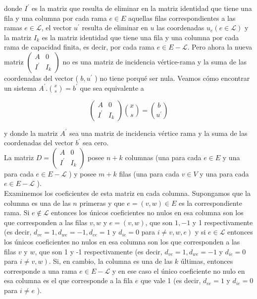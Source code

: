\documentclass[10pt]{article}
\begin{document}
donde $I^{\prime}$ es la matriz que resulta de eliminar en la matriz identidad que tiene una fila y una columna por cada rama $e \in E$ aquellas filas correspondientes a las ramas $e \in \mathcal{L}$, el vector $u^{\prime}$ resulta de eliminar en $u$ las coordenadas $u_{e}(e \in \mathcal{L})$ y la matriz $I_{k}$ es la matriz identidad que tiene una fila y una columna por cada rama de capacidad finita, es decir, por cada rama $e \in E-\mathcal{L}$. Pero ahora la nueva matriz $\left(\begin{array}{cc}A & 0 \\ I^{\prime} & I_{k}\end{array}\right)$ no es una matriz de incidencia vértice-rama y la suma de las coordenadas del vector ( $b, u^{\prime}$ ) no tiene porqué ser nula. Veamos cómo encontrar un sistema $A^{\prime} .\binom{x}{s}=b^{\prime}$ que sea equivalente a

$$
\left(\begin{array}{cc}
A & 0 \\
I^{\prime} & I_{k}
\end{array}\right)\binom{x}{s}=\binom{b}{u^{\prime}}
$$

y donde la matriz $A^{\prime}$ sea una matriz de incidencia vértice rama y la suma de las coordenadas del vector $b^{\prime}$ sea cero.\\
La matriz $D=\left(\begin{array}{cc}A & 0 \\ I^{\prime} & I_{k}\end{array}\right)$ posee $n+k$ columnas (una para cada $e \in E$ y una para cada $e \in E-\mathcal{L}$ ) y posee $m+k$ filas (una para cada $v \in V$ y una para cada $e \in E-\mathcal{L}$ ).\\
Examinemos los coeficientes de esta matriz en cada columna. Supongamos que la columna es una de las $n$ primeras y que $e=(v, w) \in E$ es la correspondiente rama. Si $e \notin \mathcal{L}$ entonces los únicos coeficientes no nulos en esa columna son los que corresponden a las filas $v, w$ y $e=(v, w)$, que son $1,-1$ y 1 respectivamente (es decir, $d_{v e}=1, d_{w e}=-1, d_{e e}=1$ y $d_{i e}=0$ para $\left.i \neq v, w, e\right)$ y si $e \in \mathcal{L}$ entonces los únicos coeficientes no nulos en esa columna son los que corresponden a las filas $v$ y $w$, que son 1 y -1 respectivamente (es decir, $d_{v e}=1, d_{w e}=-1$ y $d_{i e}=0$ para $\left.i \neq v, w\right)$. Si, en cambio, la columna es una de las $k$ últimas, entonces corresponde a una rama $e \in E-\mathcal{L}$ y en ese caso el único coeficiente no nulo en esa columna es el que corresponde a la fila $e$ que vale 1 (es decir, $d_{e e}=1$ y $d_{i e}=0$ para $i \neq e$ ).
\end{document}
